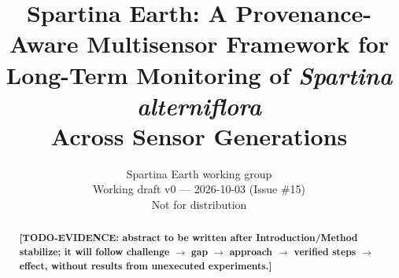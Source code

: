\documentclass[11pt,a4paper]{article}
\title{\textbf{Spartina Earth: A Provenance-Aware Multisensor Framework for\\
Long-Term Monitoring of \emph{Spartina alterniflora}\\Across Sensor Generations}}
\author{Spartina Earth working group\\[2pt]\small Working draft v0 — 2026-10-03 (Issue \#15)\\
\small Not for distribution}
\date{}
\newcommand{\todoevidence}[1]{\noindent\textcolor{red!75!black}{%
  \textsf{\textbf{[TODO-EVIDENCE: #1]}}}}
\begin{document}
\maketitle

\begin{abstract}
\todoevidence{abstract to be written after Introduction/Method stabilize;
it will follow challenge $\rightarrow$ gap $\rightarrow$ approach
$\rightarrow$ verified steps $\rightarrow$ effect, without results from
unexecuted experiments.}
\end{abstract}
















\end{document}
